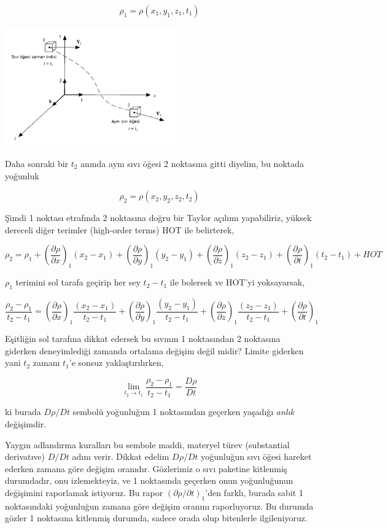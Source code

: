 \documentclass[12pt,fleqn]{article}\usepackage{../../common}
\begin{document}
$$
\rho_1 = \rho(x_1,y_1,z_1,t_1)
$$

\includegraphics[width=20em]{phy_050_cons_04.png}

Daha sonraki bir $t_2$ anında aynı sıvı öğesi 2 noktasına gitti diyelim, bu
noktada yoğunluk

$$
\rho_2 = \rho(x_2,y_2,z_2,t_2)
$$

Şimdi 1 noktası etrafında 2 noktasına doğru bir Taylor açılımı yapabiliriz,
yüksek dereceli diğer terimler (high-order terms) HOT ile belirterek,

$$
\rho_2 =
\rho_1 + \left( \frac{\partial \rho}{\partial x}  \right)_1 (x_2-x_1) +
\left( \frac{\partial \rho}{\partial y}  \right)_1 (y_2-y_1) +
\left( \frac{\partial \rho}{\partial z}  \right)_1 (z_2-z_1) +
\left( \frac{\partial \rho}{\partial t}  \right)_1 (t_2-t_1) +
HOT
$$

$\rho_1$ terimini sol tarafa geçirip her sey $t_2-t_1$ ile bolersek ve
HOT'yi yoksayarsak,

$$
\frac{\rho_2-\rho_1}{t_2-t_1} =
\left( \frac{\partial \rho}{\partial x}  \right)_1 \frac{(x_2-x_1)}{t_2-t_1} +
\left( \frac{\partial \rho}{\partial y}  \right)_1 \frac{(y_2-y_1)}{t_2-t_1} +
\left( \frac{\partial \rho}{\partial z}  \right)_1 \frac{(z_2-z_1)}{t_2-t_1} +
\left( \frac{\partial \rho}{\partial t}  \right)_1 
$$

Eşitliğin sol tarafına dikkat edersek bu sıvının 1 noktasından 2 noktasına
giderken deneyimlediği zamanda ortalama değişim değil midir? Limite giderken
yani $t_2$ zamanı $t_1$'e sonsuz yaklaştırılırken,

$$
\lim_{t_2 \to t_1} \frac{\rho_2-\rho_1}{t_2-t_1} = \frac{D\rho}{D t}
$$

ki burada $D\rho/D t$ sembolü yoğunluğun 1 noktasından geçerken yaşadığı
{\em anlık} değişimdir.

Yaygın adlandırma kuralları bu sembole maddi, materyel türev (substantial
derivatıve) $D/Dt$ adını verir. Dikkat edelim $D\rho/Dt$ yoğunluğun sıvı öğesi
hareket ederken zamana göre değişim oranıdır. Gözlerimiz o sıvı paketine
kitlenmiş durumdadır, onu izlemekteyiz, ve 1 noktasında geçerken onun
yoğunluğunun değişimini raporlamak istiyoruz. Bu rapor
$(\partial \rho / \partial t)_1$'den farklı, burada sabit 1 noktasındaki
yoğunluğun zamana göre değişim oranını raporluyoruz. Bu durumda gözler 1
noktasına kitlenmiş durumda, sadece orada olup bitenlerle ilgileniyoruz. 
\end{document}
